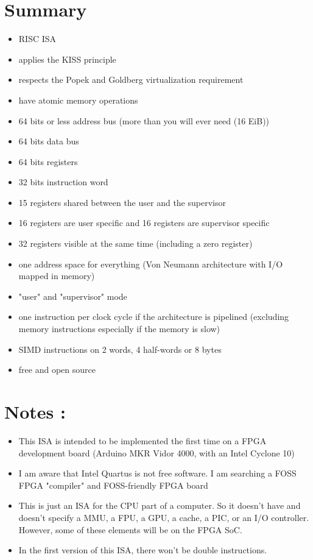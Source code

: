 \documentclass[12pt]{article}
\begin{document}
\section{Summary}
\begin{itemize}
    \item RISC ISA
    \item applies the KISS principle
    \item respects the Popek and Goldberg virtualization requirement
    \item have atomic memory operations
    \item 64 bits or less address bus (more than you will ever need (16 EiB))
    \item 64 bits data bus
    \item 64 bits registers
    \item 32 bits instruction word
    \item 15 registers shared between the user and the supervisor
    \item 16 registers are user specific and 16 registers are supervisor specific 
    \item 32 registers visible at the same time (including a zero register)
    \item one address space for everything (Von Neumann architecture with I/O mapped in memory)
    \item "user" and "supervisor" mode
    \item one instruction per clock cycle if the architecture is pipelined    
	   (excluding memory instructions especially if the memory is slow)
    \item SIMD instructions on 2 words, 4 half-words or 8 bytes
    \item free and open source
\end{itemize}
\section{Notes :}
\begin{itemize}
    \item This ISA is intended to be implemented the first time on a FPGA
        development board (Arduino MKR Vidor 4000, with an Intel Cyclone 10)

    \item I am aware that Intel Quartus is not free software. I am searching a
        FOSS FPGA "compiler" and FOSS-friendly FPGA board

    \item This is just an ISA for the CPU part of a computer. So it doesn't
        have and doesn't specify a MMU, a FPU, a GPU, a cache, a PIC, or an I/O
        controller. However, some of these elements will be on the FPGA SoC.

    \item In the first version of this ISA, there won't be double instructions.

\end{itemize}
\end{document}
